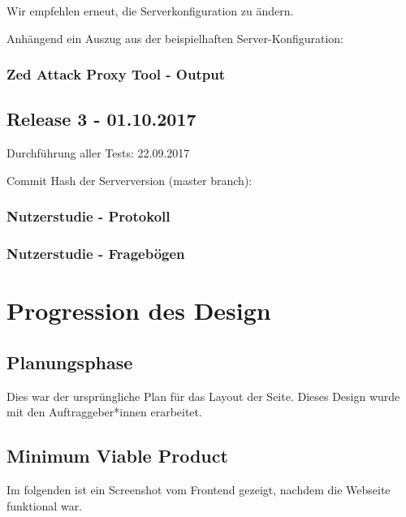 \documentclass[accentcolor=tud0b,12pt,paper=a4]{tudreport}
\begin{document}
Wir empfehlen erneut, die Serverkonfiguration zu ändern.

Anhängend ein Auszug aus der beispielhaften Server-Konfiguration:



\subsection*{Zed Attack Proxy Tool - Output}



\section*{Release 3 - 01.10.2017}
Durchführung aller Tests: 22.09.2017

Commit Hash der Serverversion (master branch): 

\subsection*{Nutzerstudie - Protokoll}


\subsection*{Nutzerstudie - Fragebögen}

\chapter*{Progression des Design}

\section*{Planungsphase}
Dies war der ursprüngliche Plan für das Layout der Seite. Dieses Design wurde mit den Auftraggeber*innen erarbeitet.




\section*{Minimum Viable Product}
Im folgenden ist ein Screenshot vom Frontend gezeigt, nachdem die Webseite funktional war.
\end{document}
